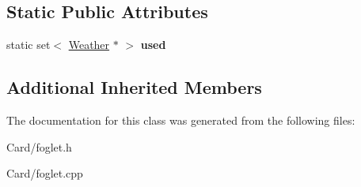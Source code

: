 \subsection*{Static Public Attributes}
\begin{DoxyCompactItemize}
\item 
\mbox{\label{class_foglet_a8ac6f4be1e6ac181b26cbb87616551a7}} 
static set$<$ \hyperlink{class_weather}{Weather} $\ast$ $>$ {\bfseries used}
\end{DoxyCompactItemize}
\subsection*{Additional Inherited Members}


The documentation for this class was generated from the following files\+:\begin{DoxyCompactItemize}
\item 
Card/foglet.\+h\item 
Card/foglet.\+cpp\end{DoxyCompactItemize}
